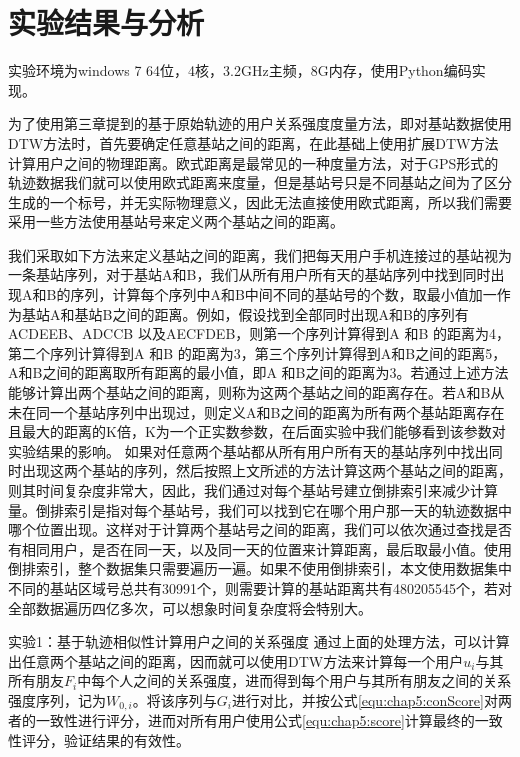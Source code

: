 \section{实验结果与分析}
\label{sec:section5-3}
实验环境为windows 7 64位，4核，3.2GHz主频，8G内存，使用Python编码实现。
\par 为了使用第三章提到的基于原始轨迹的用户关系强度度量方法，即对基站数据使用DTW方法时，首先要确定任意基站之间的距离，在此基础上使用扩展DTW方法计算用户之间的物理距离。欧式距离是最常见的一种度量方法，对于GPS形式的轨迹数据我们就可以使用欧式距离来度量，但是基站号只是不同基站之间为了区分生成的一个标号，并无实际物理意义，因此无法直接使用欧式距离，所以我们需要采用一些方法使用基站号来定义两个基站之间的距离。
\par 我们采取如下方法来定义基站之间的距离，我们把每天用户手机连接过的基站视为一条基站序列，对于基站A和B，我们从所有用户所有天的基站序列中找到同时出现A和B的序列，计算每个序列中A和B中间不同的基站号的个数，取最小值加一作为基站A和基站B之间的距离。例如，假设找到全部同时出现A和B的序列有ACDEEB、ADCCB 以及AECFDEB，则第一个序列计算得到A 和B 的距离为4，第二个序列计算得到A 和B 的距离为3，第三个序列计算得到A和B之间的距离5，A和B之间的距离取所有距离的最小值，即A 和B之间的距离为3。若通过上述方法能够计算出两个基站之间的距离，则称为这两个基站之间的距离存在。若A和B从未在同一个基站序列中出现过，则定义A和B之间的距离为所有两个基站距离存在且最大的距离的K倍，K为一个正实数参数，在后面实验中我们能够看到该参数对实验结果的影响。
如果对任意两个基站都从所有用户所有天的基站序列中找出同时出现这两个基站的序列，然后按照上文所述的方法计算这两个基站之间的距离，则其时间复杂度非常大，因此，我们通过对每个基站号建立倒排索引来减少计算量。倒排索引是指对每个基站号，我们可以找到它在哪个用户那一天的轨迹数据中哪个位置出现。这样对于计算两个基站号之间的距离，我们可以依次通过查找是否有相同用户，是否在同一天，以及同一天的位置来计算距离，最后取最小值。使用倒排索引，整个数据集只需要遍历一遍。如果不使用倒排索引，本文使用数据集中不同的基站区域号总共有30991个，则需要计算的基站距离共有480205545个，若对全部数据遍历四亿多次，可以想象时间复杂度将会特别大。
\par 实验1：基于轨迹相似性计算用户之间的关系强度
通过上面的处理方法，可以计算出任意两个基站之间的距离，因而就可以使用DTW方法来计算每一个用户$u_{i}$与其所有朋友$F_{i}$中每个人之间的关系强度，进而得到每个用户与其所有朋友之间的关系强度序列，记为$W_{0,i}$。将该序列与$G_{i}$进行对比，并按公式\ref{equ:chap5:conScore}对两者的一致性进行评分，进而对所有用户使用公式\ref{equ:chap5:score}计算最终的一致性评分，验证结果的有效性。
